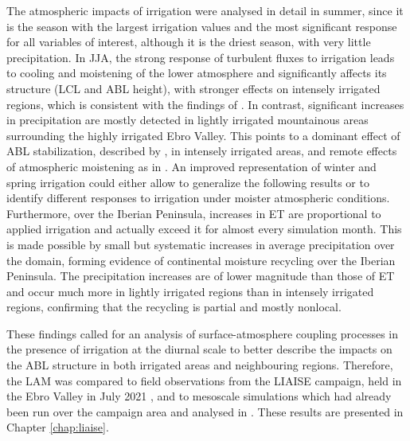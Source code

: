 The atmospheric impacts of irrigation were analysed in detail in summer, since it is the season with the largest irrigation values and the most significant response for all variables of interest, although it is the driest season, with very little precipitation. 
In JJA, the strong response of turbulent fluxes to irrigation leads to cooling and moistening of the lower atmosphere and significantly affects its structure (LCL and ABL height), with stronger effects on intensely irrigated regions, which is consistent with the findings of \citet{rappin_landatmosphere_2022}. In contrast, significant increases in precipitation are mostly detected in lightly irrigated mountainous areas surrounding the highly irrigated Ebro Valley. This points to a dominant effect of ABL stabilization, described by \citet{findell_atmospheric_2003-1, ek_influence_2004}, in intensely irrigated areas, and remote effects of atmospheric moistening as in \citet{deangelis_evidence_2010, lo_irrigation_2013, yang_impact_2017}. 
An improved representation of winter and spring irrigation could either allow to generalize the following results or to identify different responses to irrigation under moister atmospheric conditions.
Furthermore, over the Iberian Peninsula, increases in ET are proportional to applied irrigation and actually exceed it for almost every simulation month. This is made possible by small but systematic increases in average precipitation over the domain, forming evidence of continental moisture recycling over the Iberian Peninsula. The precipitation increases are of lower magnitude than those of ET and occur much more in lightly irrigated regions than in intensely irrigated regions, confirming that the recycling is partial and mostly nonlocal.

These findings called for an analysis of surface-atmosphere coupling processes in the presence of irrigation at the diurnal scale to better describe the impacts on the ABL structure in both irrigated areas and neighbouring regions.
Therefore, the LAM was compared to field observations from the LIAISE campaign, held in the Ebro Valley in July 2021 \citep{boone_land_2025}, and to mesoscale simulations which had already been run over the campaign area and analysed in \citet{lunel_irrigation_2024,lunel_marinada_2024}. These results are presented in Chapter \ref{chap:liaise}.


\hfill


\clearpage

